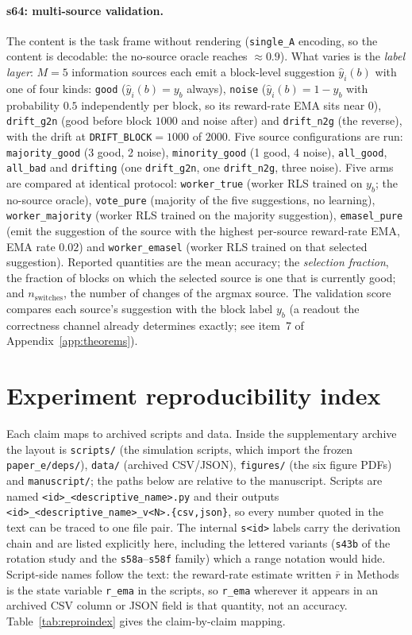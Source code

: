\documentclass[preprint,12pt]{elsarticle}
\begin{document}
\paragraph{s64: multi-source validation.} The content is the task frame
without rendering (\texttt{single\_A} encoding, so the content is decodable:
the no-source oracle reaches $\approx0.9$). What varies is the \emph{label
layer}: $M=5$ information sources each emit a block-level suggestion
$\hat y_i(b)$ with one of four kinds: \texttt{good} ($\hat y_i(b)=y_b$
always), \texttt{noise} ($\hat y_i(b)=1-y_b$ with probability $0.5$
independently per block, so its reward-rate EMA sits near $0$),
\texttt{drift\_g2n} (good before block $1000$ and noise after) and
\texttt{drift\_n2g} (the reverse), with the drift at
\texttt{DRIFT\_BLOCK}$=1000$ of $2000$. Five source configurations are run:
\texttt{majority\_good} (3 good, 2 noise), \texttt{minority\_good} (1 good,
4 noise), \texttt{all\_good}, \texttt{all\_bad} and \texttt{drifting} (one
\texttt{drift\_g2n}, one \texttt{drift\_n2g}, three noise). Five arms are
compared at identical protocol: \texttt{worker\_true} (worker RLS trained on
$y_b$; the no-source oracle), \texttt{vote\_pure} (majority of the five
suggestions, no learning), \texttt{worker\_majority} (worker RLS trained on
the majority suggestion), \texttt{emasel\_pure} (emit the suggestion of the
source with the highest per-source reward-rate EMA, EMA rate $0.02$) and
\texttt{worker\_emasel} (worker RLS trained on that selected suggestion).
Reported quantities are the mean accuracy; the \emph{selection fraction},
the fraction of blocks on which the selected source is one that is currently
good; and $n_{\mathrm{switches}}$, the number of changes of the argmax
source. The validation score compares each source's suggestion with the
block label $y_b$ (a readout the correctness channel already determines
exactly; see item~7 of Appendix~\ref{app:theorems}).

\section{Experiment reproducibility index}
\label{app:index}

Each claim maps to archived scripts and data. Inside the supplementary
archive the layout is \texttt{scripts/} (the simulation scripts, which import
the frozen \texttt{paper\_e/deps/}), \texttt{data/} (archived CSV/JSON),
\texttt{figures/} (the six figure PDFs) and \texttt{manuscript/}; the paths
below are relative to the manuscript. Scripts are named
\texttt{<id>\_<descriptive\_name>.py} and their outputs
\texttt{<id>\_<descriptive\_name>\_v<N>.\{csv,json\}}, so every number quoted in
the text can be traced to one file pair. The internal \texttt{s<id>} labels
carry the derivation chain and are listed explicitly here, including the
lettered variants (\texttt{s43b} of the rotation study and the
\texttt{s58a}--\texttt{s58f} family) which a range notation would hide.
Script-side names follow the text: the reward-rate estimate written $\bar r$ in
Methods is the state variable \texttt{r\_ema} in the scripts, so \texttt{r\_ema}
wherever it appears in an archived CSV column or JSON field is that
quantity, not an accuracy.
Table~\ref{tab:reproindex} gives the claim-by-claim mapping.
\end{document}

